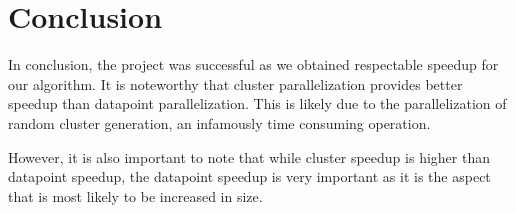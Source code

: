 \documentclass{article}
\begin{document}
\section{Conclusion}
In conclusion, the project was successful as we obtained respectable speedup for our algorithm. It is noteworthy that cluster parallelization provides better speedup than datapoint parallelization. This is likely due to the parallelization of random cluster generation, an infamously time consuming operation.

However, it is also important to note that while cluster speedup is higher than datapoint speedup, the datapoint speedup is very important as it is the aspect that is most likely to be increased in size.


\newpage




\end{document}

